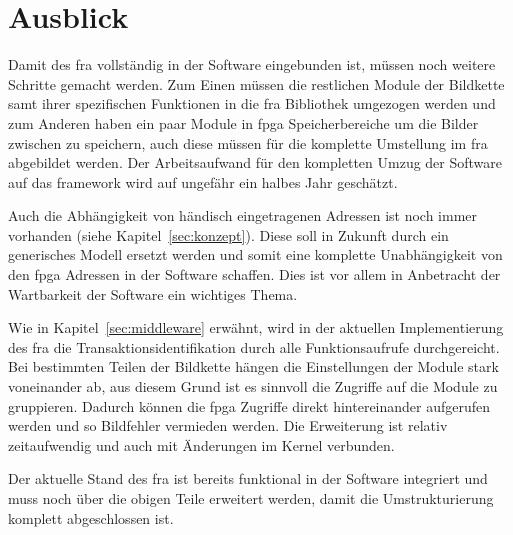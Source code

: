 \section{Ausblick}


Damit des \ac{fra} vollständig in der Software eingebunden ist, müssen noch weitere Schritte gemacht werden. Zum Einen müssen die restlichen Module der Bildkette samt ihrer spezifischen Funktionen in die \ac{fra} Bibliothek umgezogen werden und zum Anderen haben ein paar Module in \ac{fpga} Speicherbereiche um die Bilder zwischen zu speichern, auch diese müssen für die komplette Umstellung im \ac{fra} abgebildet werden. Der Arbeitsaufwand für den kompletten Umzug der Software auf das \gls{framework} wird auf ungefähr ein halbes Jahr geschätzt.

Auch die Abhängigkeit von händisch eingetragenen Adressen ist noch immer vorhanden (siehe Kapitel~\ref{sec:konzept}). Diese soll in Zukunft durch ein generisches Modell ersetzt werden und somit eine komplette Unabhängigkeit von den \ac{fpga} Adressen in der Software schaffen. Dies ist vor allem in Anbetracht der Wartbarkeit der Software ein wichtiges Thema.

Wie in Kapitel~\ref{sec:middleware} erwähnt, wird in der aktuellen Implementierung des \ac{fra} die Transaktionsidentifikation durch alle Funktionsaufrufe durchgereicht. Bei bestimmten Teilen der Bildkette hängen die Einstellungen der Module stark voneinander ab, aus diesem Grund ist es sinnvoll die Zugriffe auf die Module zu gruppieren. Dadurch können die \ac{fpga} Zugriffe direkt hintereinander aufgerufen werden und so Bildfehler vermieden werden.
Die Erweiterung ist relativ zeitaufwendig und auch mit Änderungen im Kernel verbunden.


Der aktuelle Stand des \ac{fra} ist bereits funktional in der Software integriert und muss noch über die obigen Teile erweitert werden, damit die Umstrukturierung komplett abgeschlossen ist.



















